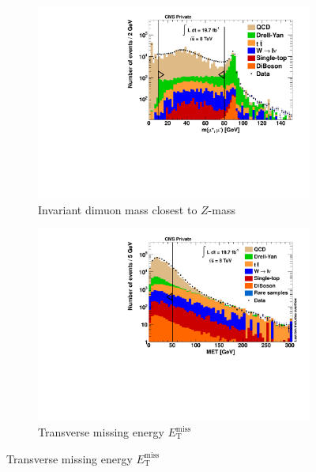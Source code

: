 \begin{figure}[!p]
  \begin{subfigure}[b]{0.495\textwidth}
    \centering
    \includegraphics[width=\textwidth]{plots/nTL_zmass.pdf}
    \caption{Invariant dimuon mass closest to $Z$-mass \label{fig:ntlzmass}}
  \end{subfigure}
  \begin{subfigure}[b]{0.495\textwidth}
    \centering
    \includegraphics[width=\textwidth]{plots/nTL_met.pdf}
    \caption{Transverse missing energy $E_{\text{T}}^{\text{miss}}$ \label{fig:ntlmet}}
  \end{subfigure}
\end{figure}

